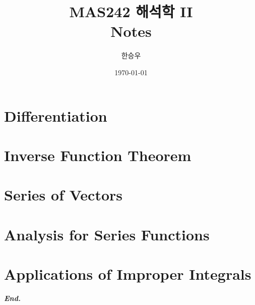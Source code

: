 \documentclass[a4paper,12pt]{report}
\title{\Huge{MAS242 해석학 II}\\Notes}
\author{\huge{한승우}}
\date{\today}
\begin{document}
\maketitle
\newpage
{}
\tikzexternaldisable
\tableofcontents
\tikzexternalenable
\pagebreak

\chapter{Differentiation}
 
\chapter{Inverse Function Theorem}
 
\chapter{Series of Vectors}
 
\chapter{Analysis for Series Functions}
 
\chapter{Applications of Improper Integrals}
 
\vfill
\begin{center}
    \textbf{\textit{End.}}
\end{center}
\end{document}
